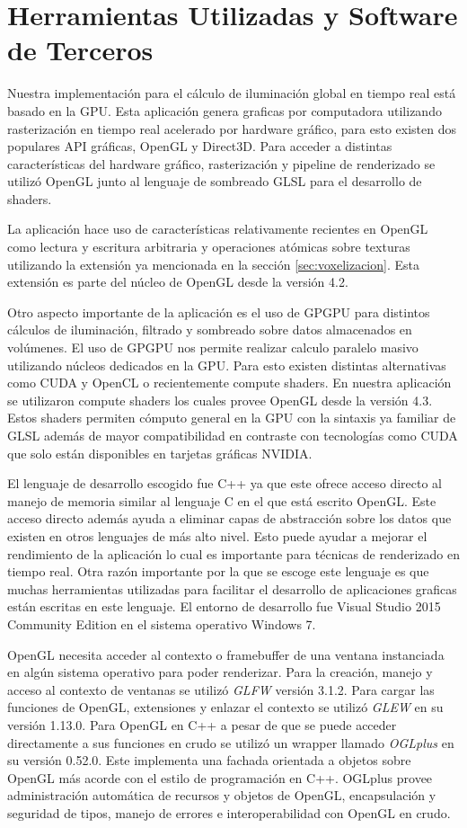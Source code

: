 \section{Herramientas Utilizadas y Software de Terceros}
Nuestra implementación para el cálculo de iluminación global en tiempo real está basado en la \ac{GPU}. Esta aplicación genera graficas por computadora utilizando rasterización en tiempo real acelerado por hardware gráfico, para esto existen dos populares API gráficas, OpenGL y Direct3D. Para acceder a distintas características del hardware gráfico, rasterización y pipeline de renderizado se utilizó OpenGL junto al lenguaje de sombreado GLSL para el desarrollo de shaders. 

La aplicación hace uso de características relativamente recientes en OpenGL como lectura y escritura arbitraria y operaciones atómicas sobre texturas utilizando la extensión ya mencionada en la sección \ref{sec:voxelizacion}. Esta extensión es parte del núcleo de OpenGL desde la versión 4.2. 

Otro aspecto importante de la aplicación es el uso de \ac{GPGPU} para distintos cálculos de iluminación, filtrado y sombreado sobre datos almacenados en volúmenes. El uso de \ac{GPGPU} nos permite realizar calculo paralelo masivo utilizando núcleos dedicados en la \ac{GPU}. Para esto existen distintas alternativas como CUDA y OpenCL o recientemente compute shaders. En nuestra aplicación se utilizaron compute shaders los cuales provee OpenGL desde la versión 4.3. Estos shaders permiten cómputo general en la GPU con la sintaxis ya familiar de GLSL además de mayor compatibilidad en contraste con tecnologías como CUDA que solo están disponibles en tarjetas gráficas NVIDIA.

El lenguaje de desarrollo escogido fue C++ ya que este ofrece acceso directo al manejo de memoria similar al lenguaje C en el que está escrito OpenGL. Este acceso directo además ayuda a eliminar capas de abstracción sobre los datos que existen en otros lenguajes de más alto nivel. Esto puede ayudar a mejorar el rendimiento de la aplicación lo cual es importante para técnicas de renderizado en tiempo real. Otra razón importante por la que se escoge este lenguaje es que muchas herramientas utilizadas para facilitar el desarrollo de aplicaciones graficas están escritas en este lenguaje. El entorno de desarrollo fue Visual Studio 2015 Community Edition en el sistema operativo Windows 7.

OpenGL necesita acceder al contexto o framebuffer de una ventana instanciada en algún sistema operativo para poder renderizar. Para la creación, manejo y acceso al contexto de ventanas se utilizó \emph{GLFW} versión 3.1.2. Para cargar las funciones de OpenGL, extensiones y enlazar el contexto se utilizó \emph{GLEW} en su versión 1.13.0. Para OpenGL en C++ a pesar de que se puede acceder directamente a sus funciones en crudo se utilizó un wrapper llamado \emph{OGLplus} en su versión 0.52.0. Este implementa una fachada orientada a objetos sobre OpenGL más acorde con el estilo de programación en C++. OGLplus provee administración automática de recursos y objetos de OpenGL, encapsulación y seguridad de tipos, manejo de errores e interoperabilidad con OpenGL en crudo.

